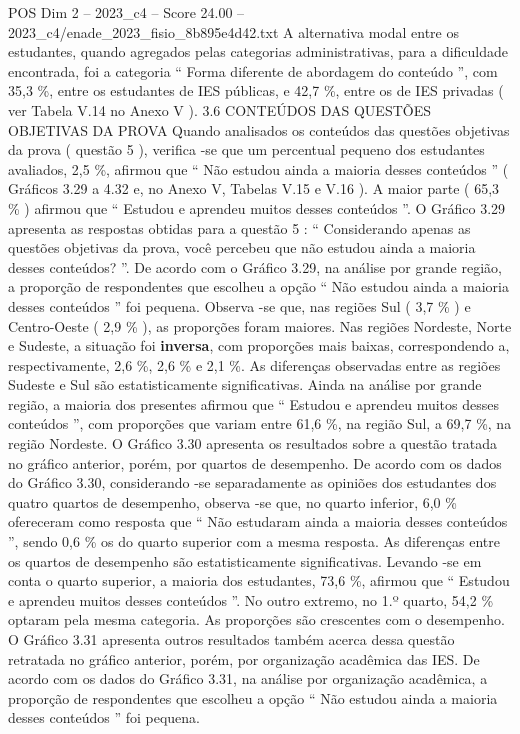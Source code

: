 \begin{textsample}{POS Dim 2 – 2023\_c4 – Score 24.00 – 2023\_c4/enade\_2023\_fisio\_8b895e4d42.txt}
A alternativa modal entre os estudantes, quando agregados pelas categorias administrativas, para a dificuldade encontrada, foi a categoria “ Forma diferente de abordagem do conteúdo ”, com 35,3 \%, entre os estudantes de IES públicas, e 42,7 \%, entre os de IES privadas ( ver Tabela V.14 no Anexo V ). 3.6 CONTEÚDOS DAS QUESTÕES OBJETIVAS DA PROVA Quando analisados os conteúdos das questões objetivas da prova ( questão 5 ), verifica -se que um percentual pequeno dos estudantes avaliados, 2,5 \%, afirmou que “ Não estudou ainda a maioria desses conteúdos ” ( Gráficos 3.29 a 4.32 e, no Anexo V, Tabelas V.15 e V.16 ).
A maior parte ( 65,3 \% ) afirmou que “ Estudou e aprendeu muitos desses conteúdos ”.
O Gráfico 3.29 apresenta as respostas obtidas para a questão 5 : “ Considerando apenas as questões objetivas da prova, você percebeu que não estudou ainda a maioria desses conteúdos? ”.
De acordo com o Gráfico 3.29, na análise por grande região, a proporção de respondentes que escolheu a opção “ Não estudou ainda a maioria desses conteúdos ” foi pequena.
Observa -se que, nas regiões Sul ( 3,7 \% ) e Centro-Oeste ( 2,9 \% ), as proporções foram maiores.
Nas regiões Nordeste, Norte e Sudeste, a situação foi \textbf{inversa}, com proporções mais baixas, correspondendo a, respectivamente, 2,6 \%, 2,6 \% e 2,1 \%.
As diferenças observadas entre as regiões Sudeste e Sul são estatisticamente significativas.
Ainda na análise por grande região, a maioria dos presentes afirmou que “ Estudou e aprendeu muitos desses conteúdos ”, com proporções que variam entre 61,6 \%, na região Sul, a 69,7 \%, na região Nordeste.
O Gráfico 3.30 apresenta os resultados sobre a questão tratada no gráfico anterior, porém, por quartos de desempenho.
De acordo com os dados do Gráfico 3.30, considerando -se separadamente as opiniões dos estudantes dos quatro quartos de desempenho, observa -se que, no quarto inferior, 6,0 \% ofereceram como resposta que “ Não estudaram ainda a maioria desses conteúdos ”, sendo 0,6 \% os do quarto superior com a mesma resposta.
As diferenças entre os quartos de desempenho são estatisticamente significativas.
Levando -se em conta o quarto superior, a maioria dos estudantes, 73,6 \%, afirmou que “ Estudou e aprendeu muitos desses conteúdos ”.
No outro extremo, no 1.º quarto, 54,2 \% optaram pela mesma categoria.
As proporções são crescentes com o desempenho.
O Gráfico 3.31 apresenta outros resultados também acerca dessa questão retratada no gráfico anterior, porém, por organização acadêmica das IES.
De acordo com os dados do Gráfico 3.31, na análise por organização acadêmica, a proporção de respondentes que escolheu a opção “ Não estudou ainda a maioria desses conteúdos ” foi pequena.

\end{textsample}
